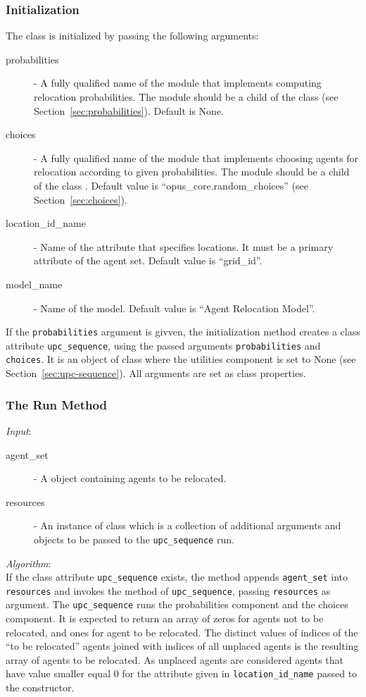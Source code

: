 %
\subsubsection{Initialization}
%
The class is initialized by passing the following arguments:
\begin{description}
\item[probabilities] - A fully qualified name of the module that implements
  computing relocation probabilities. The module should be a child of the
   class  (see Section~\ref{sec:probabilities}). 
  Default is None.
\item[choices] - A fully qualified name of the module that implements choosing
  agents for relocation according to given probabilities. The module should be
  a child of the  class .  Default value is
  ``opus_core.random_choices'' (see Section~\ref{sec:choices}).
\item[location_id_name] - Name of the attribute \attributesindex that specifies locations. It
  must be a primary attribute of the agent set. Default value is
  ``grid_id''.
\item[model_name] - Name of the model. Default value is ``Agent Relocation
  Model''. 
\end{description}
If the \verb|probabilities| argument is givven, 
the initialization method creates a class attribute \verb|upc_sequence|, using
the passed arguments \verb|probabilities| and \verb|choices|. It is an object
of class  where the utilities component is set to None
(see Section~\ref{sec:upc-sequence}). All arguments are set as class properties. 

%
\subsubsection{The Run Method}
%
{\it Input}:
\begin{description}
\item[agent_set] - A  object containing agents to be relocated.
\item[resources] - An instance of class  which is a
  collection of additional arguments and objects to be passed to the
  \verb|upc_sequence| run.
\end{description}

{\it Algorithm}:~\\[1mm]
If the class attribute \verb|upc_sequence| exists, the method appends \verb|agent_set| 
into \verb|resources| and invokes the
 method of \verb|upc_sequence|, passing \verb|resources| as
argument. The \verb|upc_sequence| runs the probabilities component and the
choices component. It is expected to return an array of zeros for agents
not to be relocated, and ones for agent to be relocated. The distinct values
of indices of the ``to be relocated'' agents joined with indices of all
unplaced agents is the resulting array of agents to be relocated. As unplaced
agents are considered agents that have value smaller equal 0 for the attribute 
given in \verb|location_id_name| passed to the constructor. 

